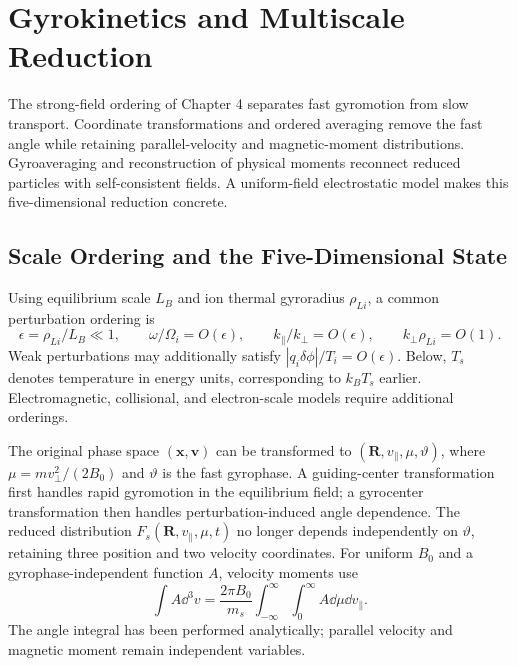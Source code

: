 \chapter{Gyrokinetics and Multiscale Reduction}\label{ch:19}
\begin{chaptersummary}
The strong-field ordering of Chapter 4 separates fast gyromotion from slow transport. Coordinate transformations and ordered averaging remove the fast angle while retaining parallel-velocity and magnetic-moment distributions. Gyroaveraging and reconstruction of physical moments reconnect reduced particles with self-consistent fields. A uniform-field electrostatic model makes this five-dimensional reduction concrete.
\end{chaptersummary}

\section{Scale Ordering and the Five-Dimensional State}
Using equilibrium scale $L_B$ and ion thermal gyroradius $\rho_{Li}$, a common perturbation ordering is
\[
\epsilon=\rho_{Li}/L_B\ll1,\qquad
\omega/\Omega_i=O(\epsilon),\qquad
k_\parallel/k_\perp=O(\epsilon),\qquad
k_\perp\rho_{Li}=O(1).
\]
Weak perturbations may additionally satisfy $|q_i\delta\phi|/T_i=O(\epsilon)$.
Below, $T_s$ denotes temperature in energy units, corresponding to $k_BT_s$ earlier.
Electromagnetic, collisional, and electron-scale models require additional orderings.

The original phase space $(\bm x,\bm v)$ can be transformed to
$(\bm R,v_\parallel,\mu,\vartheta)$,
where $\mu=m v_\perp^2/(2B_0)$ and $\vartheta$ is the fast gyrophase.
A guiding-center transformation first handles rapid gyromotion in the equilibrium field;
a gyrocenter transformation then handles perturbation-induced angle dependence.
The reduced distribution $F_s(\bm R,v_\parallel,\mu,t)$ no longer depends independently on $\vartheta$,
retaining three position and two velocity coordinates.
For uniform $B_0$ and a gyrophase-independent function $A$, velocity moments use
\[
\int A\dd^3v=\frac{2\pi B_0}{m_s}
\int_{-\infty}^{\infty}\int_0^\infty A\dd\mu\dd v_\parallel.
\]
The angle integral has been performed analytically; parallel velocity and magnetic moment remain independent variables.

